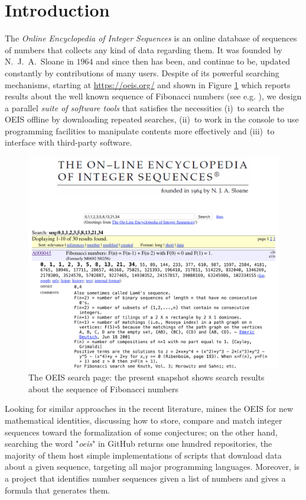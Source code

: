 
\section{Introduction}

The \textit{Online Encyclopedia of Integer Sequences} \citep{OEIS} is an online
database of sequences of numbers that collects any kind of data regarding them.
It was founded by N.~J.~A.~Sloane in $1964$ and since then has been, and
continue to be, updated constantly by contributions of many users. Despite of
its powerful searching mechanisms, starting at \url{https://oeis.org/} and
shown in Figure \ref{fig:oeis:page} which reports results about the well known
sequence of Fibonacci numbers (see e.g.  \citep{ConcreteMath}), we design a
parallel \textit{suite of software tools} that satisfies the necessities (i)~to
search the OEIS offline by downloading repeated searches, (ii)~to work in the
console to use programming facilities to manipulate contents more effectively
and (iii)~to interface with third-party software.

\begin{figure}
\centering
\includegraphics{OEIS/oeis-page}
\caption{The OEIS search page: the present snapshot shows search
results about the sequence of Fibonacci numbers }
\label{fig:oeis:page}
\end{figure}

Looking for similar approaches in the recent literature,
\citep{Nguyen_miningthe} mines the OEIS for new mathematical identities,
discussing how to store, compare and match integer sequences toward the
formalization of some conjectures; on the other hand, searching the word
"\textit{oeis}" in GitHub returns one hundred repositories, the majority of
them host simple implementations of scripts that download data about a
given sequence, targeting all major programming languages. Moreover,
\citep{weidmann:sequencer} is a project that identifies number sequences given
a list of numbers and gives a formula that generates them.

